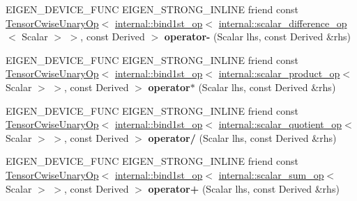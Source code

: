 \begin{DoxyCompactItemize}
E\+I\+G\+E\+N\+\_\+\+D\+E\+V\+I\+C\+E\+\_\+\+F\+U\+NC E\+I\+G\+E\+N\+\_\+\+S\+T\+R\+O\+N\+G\+\_\+\+I\+N\+L\+I\+NE friend const \hyperlink{class_eigen_1_1_tensor_cwise_unary_op}{Tensor\+Cwise\+Unary\+Op}$<$ \hyperlink{struct_eigen_1_1internal_1_1bind1st__op}{internal\+::bind1st\+\_\+op}$<$ \hyperlink{struct_eigen_1_1internal_1_1scalar__difference__op}{internal\+::scalar\+\_\+difference\+\_\+op}$<$ Scalar $>$ $>$, const Derived $>$ {\bfseries operator-\/} (Scalar lhs, const Derived \&rhs)
\item 
\mbox{\label{class_eigen_1_1_tensor_base_3_01_derived_00_01_read_only_accessors_01_4_a8bbbda6be284c0a19df2b4880a05fbac}} 
E\+I\+G\+E\+N\+\_\+\+D\+E\+V\+I\+C\+E\+\_\+\+F\+U\+NC E\+I\+G\+E\+N\+\_\+\+S\+T\+R\+O\+N\+G\+\_\+\+I\+N\+L\+I\+NE friend const \hyperlink{class_eigen_1_1_tensor_cwise_unary_op}{Tensor\+Cwise\+Unary\+Op}$<$ \hyperlink{struct_eigen_1_1internal_1_1bind1st__op}{internal\+::bind1st\+\_\+op}$<$ \hyperlink{struct_eigen_1_1internal_1_1scalar__product__op}{internal\+::scalar\+\_\+product\+\_\+op}$<$ Scalar $>$ $>$, const Derived $>$ {\bfseries operator$\ast$} (Scalar lhs, const Derived \&rhs)
\item 
\mbox{\label{class_eigen_1_1_tensor_base_3_01_derived_00_01_read_only_accessors_01_4_a9fc18b09b241938d04dd1ec05a6aada6}} 
E\+I\+G\+E\+N\+\_\+\+D\+E\+V\+I\+C\+E\+\_\+\+F\+U\+NC E\+I\+G\+E\+N\+\_\+\+S\+T\+R\+O\+N\+G\+\_\+\+I\+N\+L\+I\+NE friend const \hyperlink{class_eigen_1_1_tensor_cwise_unary_op}{Tensor\+Cwise\+Unary\+Op}$<$ \hyperlink{struct_eigen_1_1internal_1_1bind1st__op}{internal\+::bind1st\+\_\+op}$<$ \hyperlink{struct_eigen_1_1internal_1_1scalar__quotient__op}{internal\+::scalar\+\_\+quotient\+\_\+op}$<$ Scalar $>$ $>$, const Derived $>$ {\bfseries operator/} (Scalar lhs, const Derived \&rhs)
\item 
\mbox{\label{class_eigen_1_1_tensor_base_3_01_derived_00_01_read_only_accessors_01_4_a81dafbea6830f73e09fca1c26c6c160b}} 
E\+I\+G\+E\+N\+\_\+\+D\+E\+V\+I\+C\+E\+\_\+\+F\+U\+NC E\+I\+G\+E\+N\+\_\+\+S\+T\+R\+O\+N\+G\+\_\+\+I\+N\+L\+I\+NE friend const \hyperlink{class_eigen_1_1_tensor_cwise_unary_op}{Tensor\+Cwise\+Unary\+Op}$<$ \hyperlink{struct_eigen_1_1internal_1_1bind1st__op}{internal\+::bind1st\+\_\+op}$<$ \hyperlink{struct_eigen_1_1internal_1_1scalar__sum__op}{internal\+::scalar\+\_\+sum\+\_\+op}$<$ Scalar $>$ $>$, const Derived $>$ {\bfseries operator+} (Scalar lhs, const Derived \&rhs)

\end{DoxyCompactItemize}

